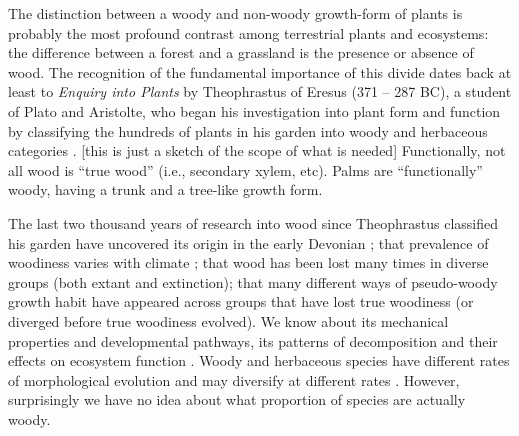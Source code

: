 \documentclass[12pt]{article}
\begin{document}
%
The distinction between a woody and non-woody growth-form of plants is
probably the most profound contrast among terrestrial plants and
ecosystems: the difference between a forest and a grassland is the
presence or absence of wood. The recognition of the fundamental
importance of this divide dates back at least to \textit{Enquiry into
  Plants} by Theophrastus of Eresus (371 -- 287 BC), a student of
Plato and Aristolte, who began his investigation into plant form and
function by classifying the hundreds of plants in his garden into
woody and herbaceous categories \citep{theophrastus1916enquiry}.
% 
[this is just a sketch of the scope of what is needed] Functionally,
not all wood is ``true wood'' (i.e., secondary xylem, etc).  Palms are
``functionally'' woody, having a trunk and a tree-like growth form.

The last two thousand years of research into wood since Theophrastus
classified his garden have uncovered its origin in the early Devonian
\citep[$\sim$~400 mya;][]{gerrienne2011simple}; that prevalence of
woodiness varies with climate \citep{judd1994}; that wood has been
lost many times in diverse groups (both extant and extinction); that
many different ways of pseudo-woody growth habit have appeared across
groups that have lost true woodiness (or diverged before true
woodiness evolved).  We know about its mechanical properties and
developmental pathways, its patterns of decomposition and their
effects on ecosystem function \citep{Cornwellwood}.  Woody and
herbaceous species have different rates of morphological evolution and
may diversify at different rates \citep{SmithDonoghue}.
%
However, surprisingly we have no idea about what proportion of species
are actually woody.

% 
\end{document}
